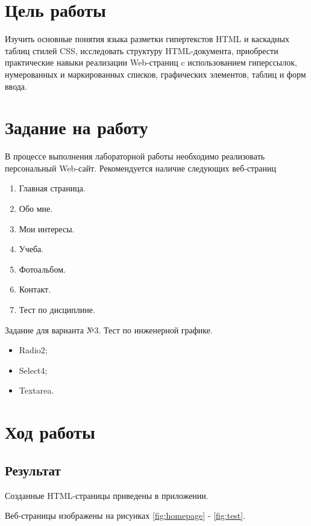 \documentclass[a4paper,14pt]{extarticle}
\begin{document}

\lstset{ %
    basicstyle=\tiny\ttfamily,
}

\section{Цель работы}
Изучить основные понятия языка разметки гипертекстов HTML и
каскадных таблиц стилей CSS, исследовать структуру HTML-документа,
приобрести практические навыки реализации Web-страниц c
использованием гиперссылок, нумерованных и маркированных списков,
графических элементов, таблиц и форм ввода.

\section{Задание на работу}
В процессе выполнения лабораторной работы необходимо реализовать 
персональный Web-сайт. Рекомендуется наличие следующих веб-страниц
\begin{enumerate}
    \item Главная страница.
    \item Обо мне.
    \item Мои интересы.
    \item Учеба.
    \item Фотоальбом.
    \item Контакт.
    \item Тест по дисциплине.
\end{enumerate}

Задание для варианта №3. Тест по инженерной графике.
\begin{itemize}
    \item Radio2;
    \item Select4;
    \item Textarea.
\end{itemize}

\section{Ход работы}
\subsection{Результат}
Созданные HTML-страницы приведены в приложении.

Веб-страницы изображены на рисунках \ref{fig:homepage} - \ref{fig:test}.
\end{document}

